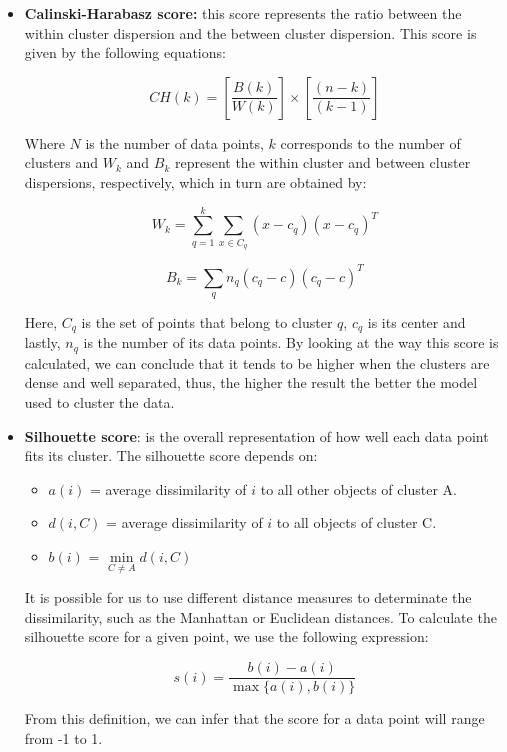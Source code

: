 \medskip
\begin{itemize}
\item \textbf{Calinski-Harabasz score:} this score represents the ratio between the within cluster dispersion and the between cluster dispersion. This score is given by the following equations:

$$CH(k) =\left[ \frac{B(k)}{W(k)}\right] \times \left[\frac{\left(n-k\right)}{\left(k-1\right)}\right]$$

Where $N$ is the number of data points, $k$ corresponds to the number of clusters and $W_k$ and $B_k$ represent the within cluster and between cluster dispersions, respectively, which in turn are obtained by:

$$W_k = \sum_{q=1}^k\sum_{x\in C_q}(x-c_q)(x-c_q)^T$$

$$B_k = \sum_q n_q(c_q-c)(c_q-c)^T$$

Here, $C_q$ is the set of points that belong to cluster $q$, $c_q$ is its center and lastly, $n_q$ is the number of its data points. By looking at the way this score is calculated, we can conclude that it tends to be higher when the clusters are dense and well separated, thus, the higher the result the better the model used to cluster the data. \cite{calinski1974dendrite} \cite{scikitlearn}

\medskip
\item \textbf{Silhouette score}: is the overall representation of how well each data point fits its cluster. The silhouette score depends on:

\begin{itemize}
	\item $a(i)$ = average dissimilarity of $i$ to all other objects of cluster A.
	\item $d(i,C)$ = average dissimilarity of $i$ to all objects of cluster C. 
	\item $b(i)$ = $\min\limits_{C \neq A} d(i,C)$
\end{itemize}

It is possible for us to use different distance measures to determinate the dissimilarity, such as the Manhattan or Euclidean distances. To calculate the silhouette score for a given point, we use the following expression:

$$s(i) = \frac{b(i)-a(i)}{\max\{a(i),b(i)\}}$$

From this definition, we can infer that the score for a data point will range from -1 to 1. \cite{rousseeuw1987silhouettes} \cite{scikitlearn}

\end{itemize}

